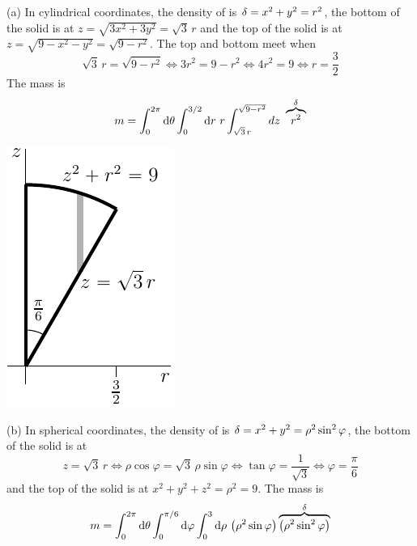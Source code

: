 \begin{solution}
(a) 
In cylindrical coordinates, the density of is $\delta=x^2+y^2=r^2$,
the bottom of the solid is at $z=\sqrt{3x^2+3y^2}=\sqrt{3}\,r$ and the
top of the solid is at $z=\sqrt{9-x^2-y^2}=\sqrt{9-r^2}$. 
The top and bottom meet when 
\begin{equation*}
\sqrt{3}\,r=\sqrt{9-r^2}\iff 3r^2=9-r^2\iff 4r^2=9\iff r=\frac{3}{2}
\end{equation*}
The mass is
\begin{align*}
m=\int_0^{2\pi}\dee{\theta}\int_0^{3/2}\dee{r}\ r\int_{\sqrt{3}\,r}^{\sqrt{9-r^2}}dz\ \overbrace{r^2}^{\de}
\end{align*}

\begin{center}
     \includegraphics{fig/OE04Q8.pdf}
\end{center}


(b) In spherical coordinates, the density of is 
$\delta=x^2+y^2=\rho^2\sin^2\varphi$,
the bottom of the solid is at 
\begin{equation*}
z=\sqrt{3}\,r\iff \rho\cos\varphi=\sqrt{3}\,\rho\sin\varphi\iff
\tan\varphi=\frac{1}{\sqrt{3}}\iff\varphi=\frac{\pi}{6}
\end{equation*} 
and the top of the solid is at $x^2+y^2+z^2=\rho^2=9$. 
The mass is
\begin{equation*}
m=\int_0^{2\pi}\dee{\theta}\int_0^{\pi/6}\dee{\varphi}\int_0^3\dee{\rho}\ \big(\rho^2\sin\varphi\big)
\overbrace{\big(\rho^2\sin^2\varphi\big)}^{\de}
\end{equation*}




\end{solution}
